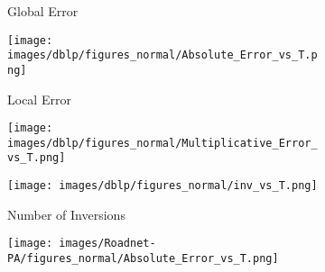 \begin{figure*}[htbp]
	\centering
	\begin{subfigure}[b]{\textwidth}
		\centering
		\begin{minipage}[b]{0.05\textwidth}
			\centering
		\end{minipage}%
		\begin{minipage}[b]{0.3\textwidth}
			\centering
			\caption*{Global Error} %
			\texttt{[image: images/dblp/figures\_normal/Absolute\_Error\_vs\_T.png]} %
			
		\end{minipage}%
		\begin{minipage}[b]{0.3\textwidth}
			\centering
			\caption*{Local Error} %
			\texttt{[image: images/dblp/figures\_normal/Multiplicative\_Error\_vs\_T.png]} %
			
		\end{minipage}%
		\begin{minipage}[b]{0.3\textwidth}
			\centering
			\caption*{Number of Inversions} %
			\texttt{[image: images/dblp/figures\_normal/inv\_vs\_T.png]} %
		\end{minipage}
	\end{subfigure}
	\begin{subfigure}[b]{\textwidth}
		\centering
	\begin{minipage}[b]{0.05\textwidth}
	\centering
\end{minipage}%
\begin{minipage}[b]{0.3\textwidth}
	\centering
	\texttt{[image: images/Roadnet-PA/figures\_normal/Absolute\_Error\_vs\_T.png]} %
	

\end{minipage}
\end{subfigure}
\end{figure*}
